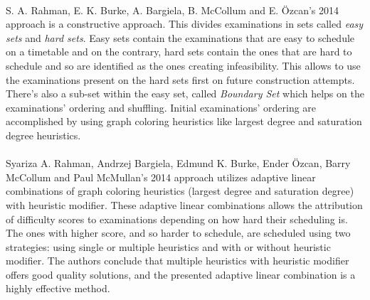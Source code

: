 \\
S. A. Rahman, E. K. Burke, A. Bargiela, B. McCollum and E. Özcan's 2014 approach \cite{Rahman2014} is a constructive approach. This divides examinations in sets called \textit{easy sets} and \textit{hard sets}. Easy sets contain the examinations that are easy to schedule on a timetable and on the contrary, hard sets contain the ones that are hard to schedule and so are identified as the ones creating infeasibility. This allows to use the examinations present on the hard sets first on future construction attempts. There's also a sub-set within the easy set, called \textit{Boundary Set} which helps on the examinations' ordering and shuffling. Initial examinations' ordering  are accomplished by using graph coloring heuristics like largest degree and saturation degree heuristics.\\
\\
Syariza A. Rahman, Andrzej Bargiela, Edmund K. Burke, Ender Özcan, Barry McCollum and Paul McMullan's 2014 approach \cite{Rahman2014a} utilizes adaptive linear combinations of graph coloring heuristics (largest degree and saturation degree) with heuristic modifier. These adaptive linear combinations allows the attribution of difficulty scores to examinations depending on how hard their scheduling is. The ones with higher score, and so harder to schedule, are scheduled using two strategies: using single or multiple heuristics and with or without heuristic modifier. The authors conclude that multiple heuristics with heuristic modifier offers good quality solutions, and the presented adaptive linear combination is a highly effective method.\\


